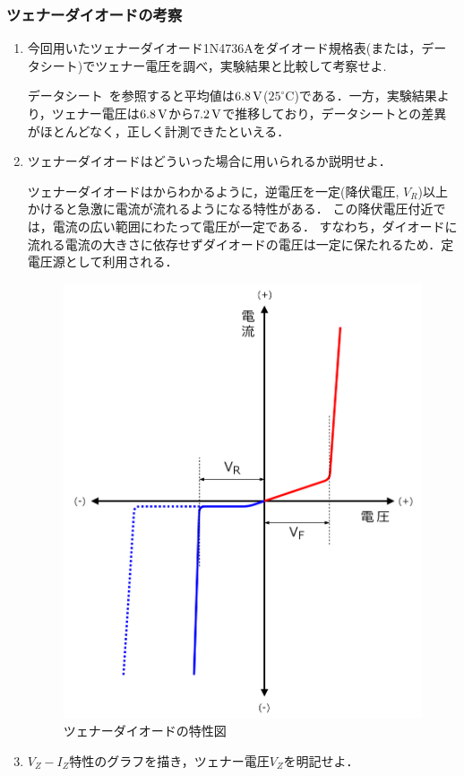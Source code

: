 \subsubsection{ツェナーダイオードの考察}
\begin{enumerate}[(1)]
\item 今回用いたツェナーダイオード1N4736Aをダイオード規格表(または，データシート)でツェナー電圧を調べ，実験結果と比較して考察せよ.

データシート~\cite{fbklsdn}を参照すると平均値は$6.8\,\rm{V}$($25^{\circ}$C)である．一方，実験結果より，ツェナー電圧は$6.8\,\rm{V}$から$7.2\,\rm{V}$で推移しており，データシートとの差異がほとんどなく，正しく計測できたといえる．
\item ツェナーダイオードはどういった場合に用いられるか説明せよ．

ツェナーダイオードはからわかるように，逆電圧を一定(降伏電圧, $V_{R}$)以上かけると急激に電流が流れるようになる特性がある．
この降伏電圧付近では，電流の広い範囲にわたって電圧が一定である．
すなわち，ダイオードに流れる電流の大きさに依存せずダイオードの電圧は一定に保たれるため．定電圧源として利用される\cite{1130282271098203vsdv4}．
\begin{figure}[h]
\centering
\includegraphics[scale=0.15]{./fig/diode-vi-curve-03.png}
\caption{ツェナーダイオードの特性図\cite{sdjabcklds}}
\label{fig:diode-vi-curve-03}
\end{figure}
\item  $V_{Z}-I_{Z}$特性のグラフを描き，ツェナー電圧$V_{Z}$を明記せよ．


\end{enumerate}
